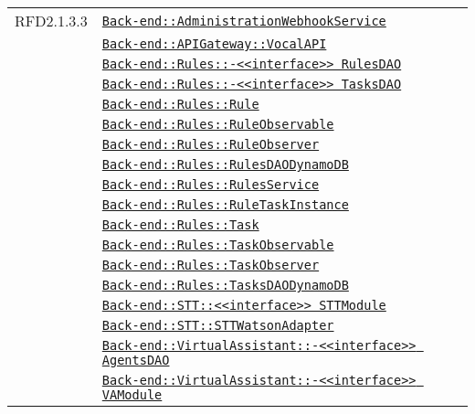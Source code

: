 \begin{longtable}{|>{\centering}m{3cm}|m{10cm}<{\centering}|}
RFD2.1.3.3 & \hyperref[Back-end::AdministrationWebhookService]{\texttt{Back-end::AdministrationWebhookService}}\\
& \hyperref[Back-end::APIGateway::VocalAPI]{\texttt{Back-end::APIGateway::VocalAPI}}\\
& \hyperref[Back-end::Rules::<<interface>> RulesDAO]{\texttt{Back-end::Rules::-\linebreak <<interface>> RulesDAO}}\\
& \hyperref[Back-end::Rules::<<interface>> TasksDAO]{\texttt{Back-end::Rules::-\linebreak <<interface>> TasksDAO}}\\
& \hyperref[Back-end::Rules::Rule]{\texttt{Back-end::Rules::Rule}}\\
& \hyperref[Back-end::Rules::RuleObservable]{\texttt{Back-end::Rules::RuleObservable}}\\
& \hyperref[Back-end::Rules::RuleObserver]{\texttt{Back-end::Rules::RuleObserver}}\\
& \hyperref[Back-end::Rules::RulesDAODynamoDB]{\texttt{Back-end::Rules::RulesDAODynamoDB}}\\
& \hyperref[Back-end::Rules::RulesService]{\texttt{Back-end::Rules::RulesService}}\\
& \hyperref[Back-end::Rules::RuleTaskInstance]{\texttt{Back-end::Rules::RuleTaskInstance}}\\
& \hyperref[Back-end::Rules::Task]{\texttt{Back-end::Rules::Task}}\\
& \hyperref[Back-end::Rules::TaskObservable]{\texttt{Back-end::Rules::TaskObservable}}\\
& \hyperref[Back-end::Rules::TaskObserver]{\texttt{Back-end::Rules::TaskObserver}}\\
& \hyperref[Back-end::Rules::TasksDAODynamoDB]{\texttt{Back-end::Rules::TasksDAODynamoDB}}\\
& \hyperref[Back-end::STT::<<interface>> STTModule]{\texttt{Back-end::STT::<<interface>> STTModule}}\\
& \hyperref[Back-end::STT::STTWatsonAdapter]{\texttt{Back-end::STT::STTWatsonAdapter}}\\
& \hyperref[Back-end::VirtualAssistant::<<interface>> AgentsDAO]{\texttt{Back-end::VirtualAssistant::-\linebreak <<interface>> AgentsDAO}}\\
& \hyperref[Back-end::VirtualAssistant::<<interface>> VAModule]{\texttt{Back-end::VirtualAssistant::-\linebreak <<interface>> VAModule}}\\

\end{longtable}
